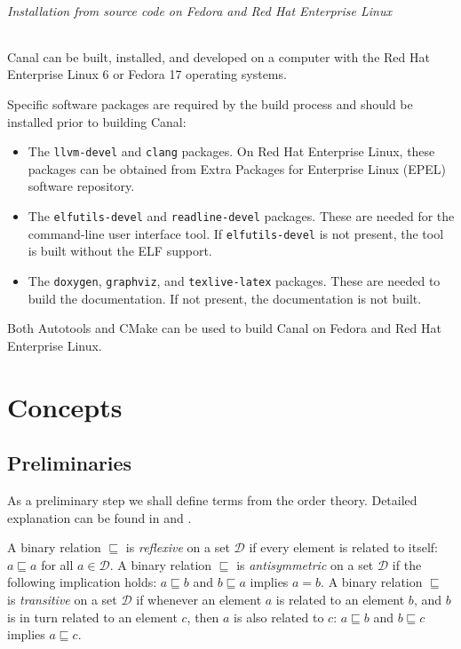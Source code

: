 \documentclass[a4paper]{book}
\begin{document}



\paragraph*{Installation from source code on Fedora and Red Hat
  Enterprise Linux}

Canal can be built, installed, and developed on a computer with the
Red Hat Enterprise Linux 6 or Fedora 17 operating systems.

Specific software packages are required by the build process and
should be installed prior to building Canal:
\begin{itemize}
\item The \texttt{llvm-devel} and \texttt{clang} packages.  On Red Hat
  Enterprise Linux, these packages can be obtained from Extra Packages
  for Enterprise Linux (EPEL) software repository.
\item The \texttt{elfutils-devel} and \texttt{readline-devel}
  packages.  These are needed for the command-line user interface
  tool.  If \texttt{elfutils-devel} is not present, the tool is built
  without the ELF support.
\item The \texttt{doxygen}, \texttt{graphviz}, and
  \texttt{texlive-latex} packages.  These are needed to build the
  documentation.  If not present, the documentation is not built.
\end{itemize}

Both Autotools and CMake can be used to build Canal on Fedora and Red
Hat Enterprise Linux.

\part{Concepts}

\chapter{Preliminaries}

As a preliminary step we shall define terms from the order theory.
Detailed explanation can be found in \cite{DP02} and \cite{BCG02}.

A binary relation $\sqsubseteq$ is \emph{reflexive} on a set
$\mathcal{D}$ if every element is related to itself: $a \sqsubseteq a$
for all $a \in \mathcal{D}$.  A binary relation $\sqsubseteq$ is
\emph{antisymmetric} on a set $\mathcal{D}$ if the following
implication holds: $a \sqsubseteq b$ and $b \sqsubseteq a$ implies $a
= b$.  A binary relation $\sqsubseteq$ is \emph{transitive} on a set
$\mathcal{D}$ if whenever an element $a$ is related to an element $b$,
and $b$ is in turn related to an element $c$, then $a$ is also related
to $c$: $a \sqsubseteq b$ and $b \sqsubseteq c$ implies $a \sqsubseteq
c$.
\end{document}
